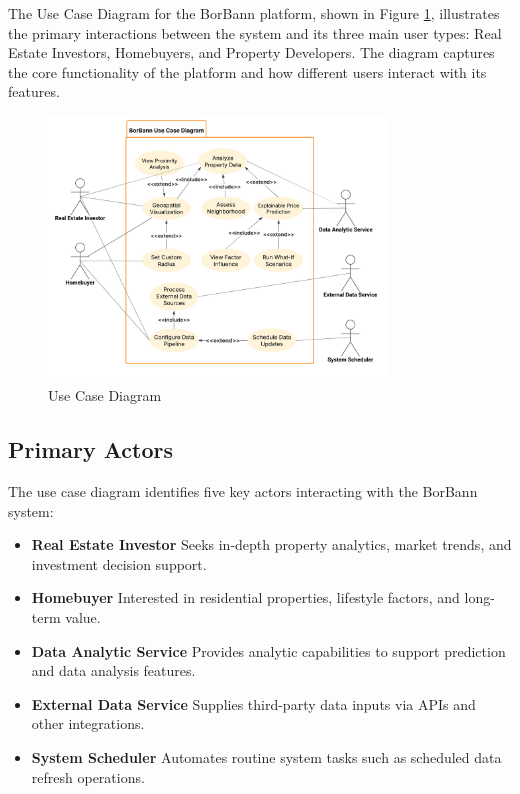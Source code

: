 The Use Case Diagram for the BorBann platform, shown in Figure \ref{fig:use-case-diagram}, illustrates the primary interactions between the system and its three main user types: Real Estate Investors, Homebuyers, and Property Developers. The diagram captures the core functionality of the platform and how different users interact with its features.

\begin{figure}[htbp]
	\centering
	\includegraphics[width=0.8\textwidth]{assets/BorBann_Use_Case_Diagram.png}
	\caption{Use Case Diagram}
	\label{fig:use-case-diagram}
\end{figure}


\subsection{Primary Actors}

The use case diagram identifies five key actors interacting with the BorBann system:

\begin{itemize}
	\item \textbf{Real Estate Investor}  
	      Seeks in-depth property analytics, market trends, and investment decision support.
	      
	\item \textbf{Homebuyer}  
	      Interested in residential properties, lifestyle factors, and long-term value.
	      
	\item \textbf{Data Analytic Service}  
	      Provides analytic capabilities to support prediction and data analysis features.
	      
	\item \textbf{External Data Service}  
	      Supplies third-party data inputs via APIs and other integrations.
	      
	\item \textbf{System Scheduler}  
	      Automates routine system tasks such as scheduled data refresh operations.
\end{itemize}

